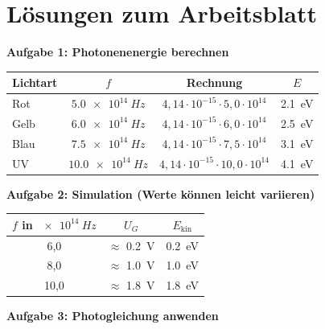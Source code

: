 \documentclass[11pt,a4paper]{article}
\begin{document}
\newpage


\section*{Lösungen zum Arbeitsblatt}

\textbf{Aufgabe 1: Photonenenergie berechnen}

\begin{tabular}{|l|c|c|c|}
\hline
\textbf{Lichtart} & \textbf{$f$} & \textbf{Rechnung} & \textbf{$E$} \\
\hline
Rot & $\SI{5,0e14}{Hz}$ & {\color{loesung} $4,14 \cdot 10^{-15} \cdot 5,0 \cdot 10^{14}$} & {\color{loesung} \SI{2,1}{eV}} \\
\hline
Gelb & $\SI{6,0e14}{Hz}$ & {\color{loesung} $4,14 \cdot 10^{-15} \cdot 6,0 \cdot 10^{14}$} & {\color{loesung} \SI{2,5}{eV}} \\
\hline
Blau & $\SI{7,5e14}{Hz}$ & {\color{loesung} $4,14 \cdot 10^{-15} \cdot 7,5 \cdot 10^{14}$} & {\color{loesung} \SI{3,1}{eV}} \\
\hline
UV & $\SI{10,0e14}{Hz}$ & {\color{loesung} $4,14 \cdot 10^{-15} \cdot 10,0 \cdot 10^{14}$} & {\color{loesung} \SI{4,1}{eV}} \\
\hline
\end{tabular}

\vspace{0.5em}

\textbf{Aufgabe 2: Simulation (Werte können leicht variieren)}

\begin{tabular}{|c|c|c|}
\hline
$f$ in $\SI{e14}{Hz}$ & $U_G$ & $E_{\text{kin}}$ \\
\hline
6,0 & {\color{loesung} $\approx$ \SI{0,2}{V}} & {\color{loesung} \SI{0,2}{eV}} \\
\hline
8,0 & {\color{loesung} $\approx$ \SI{1,0}{V}} & {\color{loesung} \SI{1,0}{eV}} \\
\hline
10,0 & {\color{loesung} $\approx$ \SI{1,8}{V}} & {\color{loesung} \SI{1,8}{eV}} \\
\hline
\end{tabular}

\vspace{0.5em}

\textbf{Aufgabe 3: Photogleichung anwenden}
\end{document}
